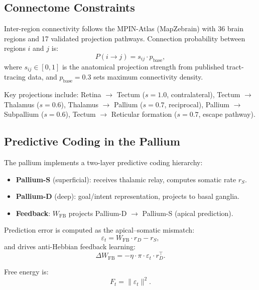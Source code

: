 \documentclass[9pt]{elife}
\begin{document}
\subsection{Connectome Constraints}

Inter-region connectivity follows the MPIN-Atlas (MapZebrain) with 36 brain regions
and 17 validated projection pathways.
Connection probability between regions $i$ and $j$ is:
\begin{equation}
P(i \to j) = s_{ij} \cdot p_{\mathrm{base}},
\end{equation}
where $s_{ij} \in [0, 1]$ is the anatomical projection strength from published
tract-tracing data, and $p_{\mathrm{base}} = 0.3$ sets maximum connectivity density.

Key projections include:
Retina $\to$ Tectum ($s = 1.0$, contralateral),
Tectum $\to$ Thalamus ($s = 0.6$),
Thalamus $\to$ Pallium ($s = 0.7$, reciprocal),
Pallium $\to$ Subpallium ($s = 0.6$),
Tectum $\to$ Reticular formation ($s = 0.7$, escape pathway).

\subsection{Predictive Coding in the Pallium}

The pallium implements a two-layer predictive coding hierarchy:
\begin{itemize}
\item \textbf{Pallium-S} (superficial): receives thalamic relay, computes somatic rate $r_S$.
\item \textbf{Pallium-D} (deep): goal/intent representation, projects to basal ganglia.
\item \textbf{Feedback}: $W_{\mathrm{FB}}$ projects Pallium-D $\to$ Pallium-S (apical prediction).
\end{itemize}

Prediction error is computed as the apical--somatic mismatch:
\begin{equation}
\varepsilon_t = W_{\mathrm{FB}} \cdot r_D - r_S,
\end{equation}
and drives anti-Hebbian feedback learning:
\begin{equation}
\Delta W_{\mathrm{FB}} = -\eta \cdot \pi \cdot \varepsilon_t \cdot r_D^\top.
\end{equation}

Free energy is:
\begin{equation}
F_t = \|\varepsilon_t\|^2.
\end{equation}
\end{document}
